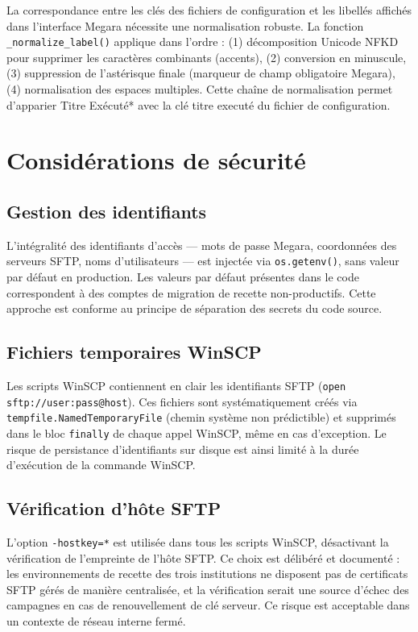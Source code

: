 \documentclass[12pt, a4paper]{report}
\begin{document}
La correspondance entre les clés des fichiers de configuration et les libellés affichés dans l'interface Megara nécessite une normalisation robuste. La fonction \texttt{\_normalize\_label()} applique dans l'ordre : (1) décomposition Unicode NFKD pour supprimer les caractères combinants (accents), (2) conversion en minuscule, (3) suppression de l'astérisque finale (marqueur de champ obligatoire Megara), (4) normalisation des espaces multiples. Cette chaîne de normalisation permet d'apparier \og{}Titre Exécuté*\fg{} avec la clé \og{}titre executé\fg{} du fichier de configuration.

\section{Considérations de sécurité}

\subsection{Gestion des identifiants}

L'intégralité des identifiants d'accès — mots de passe Megara, coordonnées des serveurs SFTP, noms d'utilisateurs — est injectée via \texttt{os.getenv()}, sans valeur par défaut en production. Les valeurs par défaut présentes dans le code correspondent à des comptes de migration de recette non-productifs. Cette approche est conforme au principe de séparation des secrets du code source.

\subsection{Fichiers temporaires WinSCP}

Les scripts WinSCP contiennent en clair les identifiants SFTP (\texttt{open sftp://user:pass@host}). Ces fichiers sont systématiquement créés via \texttt{tempfile.NamedTemporaryFile} (chemin système non prédictible) et supprimés dans le bloc \texttt{finally} de chaque appel WinSCP, même en cas d'exception. Le risque de persistance d'identifiants sur disque est ainsi limité à la durée d'exécution de la commande WinSCP.

\subsection{Vérification d'hôte SFTP}

L'option \texttt{-hostkey=*} est utilisée dans tous les scripts WinSCP, désactivant la vérification de l'empreinte de l'hôte SFTP. Ce choix est délibéré et documenté : les environnements de recette des trois institutions ne disposent pas de certificats SFTP gérés de manière centralisée, et la vérification serait une source d'échec des campagnes en cas de renouvellement de clé serveur. Ce risque est acceptable dans un contexte de réseau interne fermé.
\end{document}
